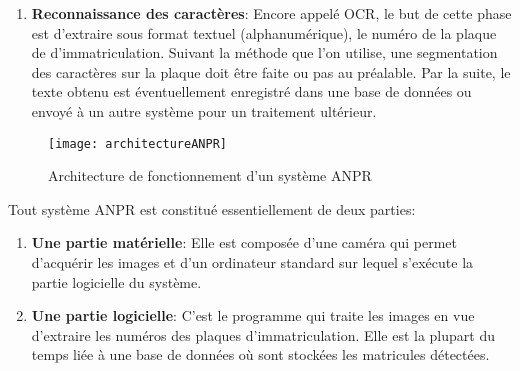 \begin{enumerate}
\begin{itemize}
        \end{itemize}
    \item \textbf{Reconnaissance des caractères}: Encore appelé OCR, le but de cette phase est d’extraire sous format textuel (alphanumérique), le numéro de la plaque de d’immatriculation. Suivant la méthode que l’on utilise, une segmentation des caractères sur la plaque doit être faite ou pas au préalable. Par la suite, le texte obtenu est éventuellement enregistré dans une base de données ou envoyé à un autre système pour un traitement ultérieur.
\end{enumerate}

\begin{figure}[H]
    \centering
    \texttt{[image: architectureANPR]}
    \caption{Architecture de fonctionnement d'un système ANPR}
\end{figure}

Tout système ANPR est constitué essentiellement de deux parties:
    \begin{enumerate}
        \item \textbf{Une partie matérielle}: Elle est composée d’une caméra qui permet d’acquérir les images et d’un ordinateur standard sur lequel s'exécute la partie logicielle du système.
        \item \textbf{Une partie logicielle}: C’est le programme qui traite les images en vue d’extraire les numéros des plaques d’immatriculation. Elle est la plupart du temps liée à une base de données où sont stockées les matricules détectées.
    \end{enumerate}